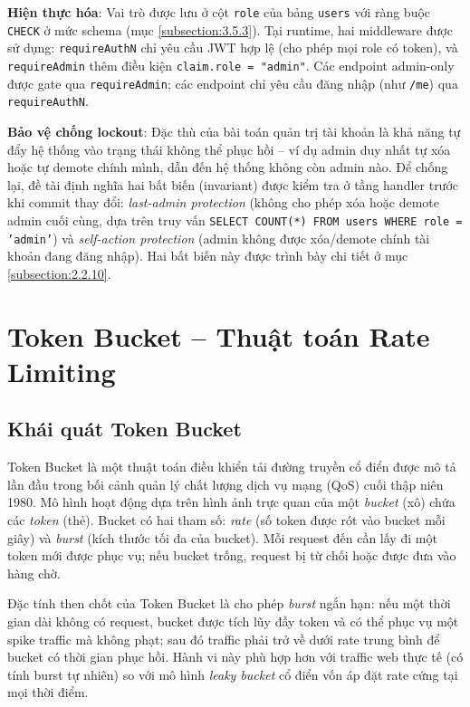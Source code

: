 \documentclass[../DoAn.tex]{subfiles}
\begin{document}
\textbf{Hiện thực hóa}: Vai trò được lưu ở cột \texttt{role} của bảng
\texttt{users} với ràng buộc \texttt{CHECK} ở mức schema (mục
\ref{subsection:3.5.3}). Tại runtime, hai middleware được sử dụng:
\texttt{requireAuthN} chỉ yêu cầu JWT hợp lệ (cho phép mọi role có token),
và \texttt{requireAdmin} thêm điều kiện \texttt{claim.role = "admin"}.
Các endpoint admin-only được gate qua \texttt{requireAdmin}; các endpoint
chỉ yêu cầu đăng nhập (như \texttt{/me}) qua \texttt{requireAuthN}.

\textbf{Bảo vệ chống lockout}: Đặc thù của bài toán quản trị tài khoản là
khả năng tự đẩy hệ thống vào trạng thái không thể phục hồi -- ví dụ admin
duy nhất tự xóa hoặc tự demote chính mình, dẫn đến hệ thống không còn admin
nào. Để chống lại, đề tài định nghĩa hai bất biến (invariant) được kiểm tra
ở tầng handler trước khi commit thay đổi: \textit{last-admin protection}
(không cho phép xóa hoặc demote admin cuối cùng, dựa trên truy vấn
\texttt{SELECT COUNT(*) FROM users WHERE role = 'admin'}) và \textit{self-action
protection} (admin không được xóa/demote chính tài khoản đang đăng nhập).
Hai bất biến này được trình bày chi tiết ở mục \ref{subsection:2.2.10}.

\section{Token Bucket -- Thuật toán Rate Limiting}
\label{section:3.7}

\subsection{Khái quát Token Bucket}
\label{subsection:3.7.1}

Token Bucket là một thuật toán điều khiển tải đường truyền cổ điển được
mô tả lần đầu trong bối cảnh quản lý chất lượng dịch vụ mạng (QoS) cuối
thập niên 1980. Mô hình hoạt động dựa trên hình ảnh trực quan của một
\textit{bucket} (xô) chứa các \textit{token} (thẻ). Bucket có hai tham số:
\textit{rate} (số token được rót vào bucket mỗi giây) và \textit{burst}
(kích thước tối đa của bucket). Mỗi request đến cần lấy đi một token mới
được phục vụ; nếu bucket trống, request bị từ chối hoặc được đưa vào hàng
chờ.

Đặc tính then chốt của Token Bucket là cho phép \textit{burst} ngắn hạn:
nếu một thời gian dài không có request, bucket được tích lũy đầy token và
có thể phục vụ một spike traffic mà không phạt; sau đó traffic phải trở về
dưới rate trung bình để bucket có thời gian phục hồi. Hành vi này phù hợp
hơn với traffic web thực tế (có tính burst tự nhiên) so với mô hình
\textit{leaky bucket} cổ điển vốn áp đặt rate cứng tại mọi thời điểm.
\end{document}
